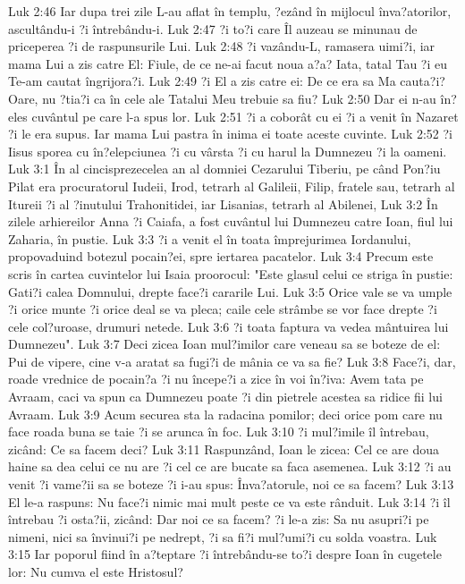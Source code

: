 Luk 2:46  Iar dupa trei zile L-au aflat în templu, ?ezând în mijlocul înva?atorilor, ascultându-i ?i întrebându-i.
Luk 2:47  ?i to?i care Îl auzeau se minunau de priceperea ?i de raspunsurile Lui.
Luk 2:48  ?i vazându-L, ramasera uimi?i, iar mama Lui a zis catre El: Fiule, de ce ne-ai facut noua a?a? Iata, tatal Tau ?i eu Te-am cautat îngrijora?i.
Luk 2:49  ?i El a zis catre ei: De ce era sa Ma cauta?i? Oare, nu ?tia?i ca în cele ale Tatalui Meu trebuie sa fiu?
Luk 2:50  Dar ei n-au în?eles cuvântul pe care l-a spus lor.
Luk 2:51  ?i a coborât cu ei ?i a venit în Nazaret ?i le era supus. Iar mama Lui pastra în inima ei toate aceste cuvinte.
Luk 2:52  ?i Iisus sporea cu în?elepciunea ?i cu vârsta ?i cu harul la Dumnezeu ?i la oameni.
Luk 3:1  În al cincisprezecelea an al domniei Cezarului Tiberiu, pe când Pon?iu Pilat era procuratorul Iudeii, Irod, tetrarh al Galileii, Filip, fratele sau, tetrarh al Itureii ?i al ?inutului Trahonitidei, iar Lisanias, tetrarh al Abilenei,
Luk 3:2  În zilele arhiereilor Anna ?i Caiafa, a fost cuvântul lui Dumnezeu catre Ioan, fiul lui Zaharia, în pustie.
Luk 3:3  ?i a venit el în toata împrejurimea Iordanului, propovaduind botezul pocain?ei, spre iertarea pacatelor.
Luk 3:4  Precum este scris în cartea cuvintelor lui Isaia proorocul: "Este glasul celui ce striga în pustie: Gati?i calea Domnului, drepte face?i cararile Lui.
Luk 3:5  Orice vale se va umple ?i orice munte ?i orice deal se va pleca; caile cele strâmbe se vor face drepte ?i cele col?uroase, drumuri netede.
Luk 3:6  ?i toata faptura va vedea mântuirea lui Dumnezeu".
Luk 3:7  Deci zicea Ioan mul?imilor care veneau sa se boteze de el: Pui de vipere, cine v-a aratat sa fugi?i de mânia ce va sa fie?
Luk 3:8  Face?i, dar, roade vrednice de pocain?a ?i nu începe?i a zice în voi în?iva: Avem tata pe Avraam, caci va spun ca Dumnezeu poate ?i din pietrele acestea sa ridice fii lui Avraam.
Luk 3:9  Acum securea sta la radacina pomilor; deci orice pom care nu face roada buna se taie ?i se arunca în foc.
Luk 3:10  ?i mul?imile îl întrebau, zicând: Ce sa facem deci?
Luk 3:11  Raspunzând, Ioan le zicea: Cel ce are doua haine sa dea celui ce nu are ?i cel ce are bucate sa faca asemenea.
Luk 3:12  ?i au venit ?i vame?ii sa se boteze ?i i-au spus: Înva?atorule, noi ce sa facem?
Luk 3:13  El le-a raspuns: Nu face?i nimic mai mult peste ce va este rânduit.
Luk 3:14  ?i îl întrebau ?i osta?ii, zicând: Dar noi ce sa facem? ?i le-a zis: Sa nu asupri?i pe nimeni, nici sa învinui?i pe nedrept, ?i sa fi?i mul?umi?i cu solda voastra.
Luk 3:15  Iar poporul fiind în a?teptare ?i întrebându-se to?i despre Ioan în cugetele lor: Nu cumva el este Hristosul?

